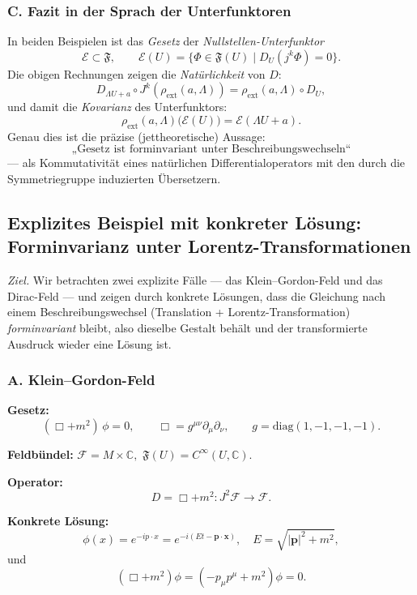 \documentclass[10pt, letterpaper]{article}
\newcommand{\C}{\mathbb{C}}
\begin{document}
\bigskip
\subsubsection*{C. Fazit in der Sprach der Unterfunktoren}

In beiden Beispielen ist das \emph{Gesetz} der \emph{Nullstellen-Unterfunktor}
\[
\mathcal E \subset \mathfrak F,\qquad \mathcal E(U)=\{\Phi\in\mathfrak F(U)\mid D_U(j^k\Phi)=0\}.
\]
Die obigen Rechnungen zeigen die \emph{Natürlichkeit} von $D$:
\[
D_{\Lambda U+a}\circ J^k(\rho_{\mathrm{ext}}(a,\Lambda))
=\rho_{\mathrm{ext}}(a,\Lambda)\circ D_U,
\]
und damit die \emph{Kovarianz} des Unterfunktors:
\[
\rho_{\mathrm{ext}}(a,\Lambda)\big(\mathcal E(U)\big)=\mathcal E(\Lambda U+a).
\]
Genau dies ist die präzise (jettheoretische) Aussage:
\[
\boxed{\text{„Gesetz ist forminvariant unter Beschreibungswechseln“}}
\]
— als Kommutativität eines natürlichen Differentialoperators mit den
durch die Symmetriegruppe induzierten Übersetzern.

\pagebreak

\subsection{Explizites Beispiel mit konkreter Lösung: Forminvarianz unter Lorentz-Transformationen}

\emph{Ziel.}  
Wir betrachten zwei explizite Fälle — das Klein–Gordon-Feld und das Dirac-Feld — 
und zeigen durch konkrete Lösungen, dass die Gleichung nach einem 
Beschreibungswechsel (Translation + Lorentz-Transformation) \emph{forminvariant} bleibt, 
also dieselbe Gestalt behält und der transformierte Ausdruck wieder eine Lösung ist.

\bigskip
\subsubsection*{A. Klein–Gordon-Feld}

\textbf{Gesetz:}
\[
(\Box + m^2)\,\phi = 0, 
\qquad 
\Box = g^{\mu\nu}\partial_\mu\partial_\nu,
\qquad
g = \mathrm{diag}(1,-1,-1,-1).
\]

\textbf{Feldbündel:}
\(\mathcal F = M\times\C,\)
\(\mathfrak F(U)=C^\infty(U,\C).\)

\textbf{Operator:}
\[
D = \Box + m^2 : J^2\mathcal F \to \mathcal F.
\]

\textbf{Konkrete Lösung:}
\[
\phi(x) = e^{-ip\cdot x} = e^{-i(Et-\mathbf{p}\cdot\mathbf{x})},
\quad
E=\sqrt{|\mathbf p|^2+m^2},
\]
und
\[
(\Box + m^2)\phi = (-p_\mu p^\mu + m^2)\phi = 0.
\]
\end{document}
